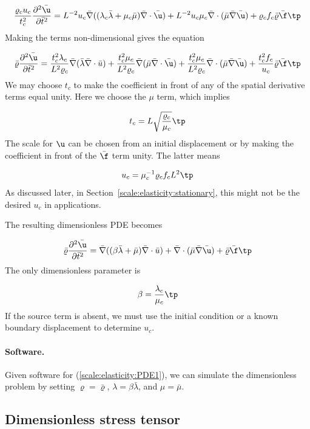 \documentclass[graybox,envcountchap,sectrefs,final]{svmonodo}
\begin{document}
\[
\frac{\varrho_c u_c}{t_c^2}
\frac{\partial^2\bar \u}{\partial \bar t^2} =
L^{-2}u_c\bar \nabla ((\lambda_c\bar\lambda +
\mu_c\bar\mu)\bar \nabla\cdot\bar \u) +
L^{-2}u_c\mu_c\bar \nabla\cdot(\bar \mu\bar \nabla\bar \u) +
\varrho_cf_c\bar\varrho\bar\f\tp
\]
Making the terms non-dimensional gives the equation

\begin{equation}
\bar\varrho\frac{\partial^2\bar \u}{\partial \bar t^2} =
\frac{t_c^2\lambda_c}{L^2\varrho_c}
\bar \nabla (\bar\lambda\bar\nabla\cdot\bar u) +
\frac{t_c^2\mu_c}{L^2\varrho_c}
\bar\nabla(\bar\mu \bar\nabla\cdot\bar \u) +
\frac{t_c^2\mu_c}{L^2\varrho_c}\bar \nabla\cdot(\bar \mu\bar \nabla\bar \u) +
\frac{t_c^2f_c}{u_c}\bar\varrho\bar\f\tp
\end{equation}
We may choose $t_c$ to make the coefficient in front of any of the spatial
derivative terms equal unity. Here we choose the $\mu$ term, which implies

\[ t_c = L\sqrt{\frac{\varrho_c}{\mu_c}}\tp\]
The scale for $\u$ can be chosen from an initial displacement or by
making the coefficient in front of the $\bar\f$ term unity. The latter
means

\[ u_c = \mu_c^{-1}\varrho_cf_cL^2\tp\]
As discussed later, in Section~\ref{scale:elasticity:stationary},
this might not be the desired $u_c$ in applications.

The resulting dimensionless PDE becomes

\begin{equation}
\bar\varrho\frac{\partial^2\bar \u}{\partial \bar t^2} =
\bar \nabla ((\beta\bar\lambda + \bar\mu)\bar\nabla\cdot\bar u) +
\bar \nabla\cdot(\bar \mu\bar \nabla\bar \u) +
\bar\varrho\bar\f\tp
\end{equation}
The only dimensionless parameter is

\[ \beta = \frac{\lambda_c}{\mu_c}\tp\]
If the source term is absent, we must use the initial condition or
a known boundary displacement to
determine $u_c$.

\paragraph{Software.}
Given software for (\ref{scale:elasticity:PDE1}),
we can simulate the dimensionless problem by setting $\varrho =\bar\varrho$,
$\lambda =\beta\bar\lambda$, and $\mu = \bar\mu$.


\subsection{Dimensionless stress tensor}
\label{scale:elasticity:PDE1:stress}
\end{document}

